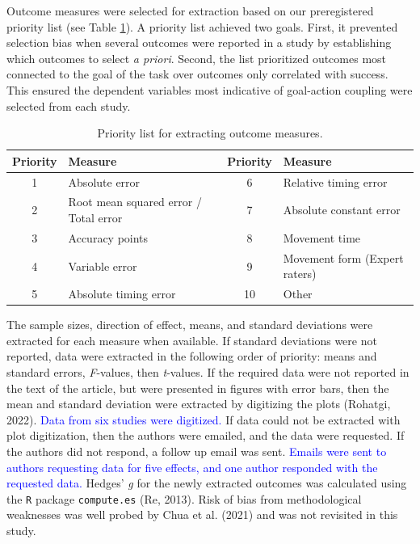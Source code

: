 \documentclass[
  man, donotrepeattitle,floatsintext]{apa7}
\begin{document}
Outcome measures were selected for extraction based on our preregistered priority list (see Table \ref{tab:table1}). A priority list achieved two goals. First, it prevented selection bias when several outcomes were reported in a study by establishing which outcomes to select \emph{a priori}. Second, the list prioritized outcomes most connected to the goal of the task over outcomes only correlated with success. This ensured the dependent variables most indicative of goal-action coupling were selected from each study.

\begin{table}

\caption{\label{tab:table1}Priority list for extracting outcome measures.}
\fontsize{10}{12}\selectfont
\begin{tabular}[t]{clcl}
\toprule
Priority & Measure & Priority & Measure\\
\midrule
1 & Absolute error & 6 & Relative timing error\\
2 & Root mean squared error / Total error & 7 & Absolute constant error\\
3 & Accuracy points & 8 & Movement time\\
4 & Variable error & 9 & Movement form (Expert raters)\\
5 & Absolute timing error & 10 & Other\\
\bottomrule
\end{tabular}
\end{table}

The sample sizes, direction of effect, means, and standard deviations were extracted for each measure when available. If standard deviations were not reported, data were extracted in the following order of priority: means and standard errors, \emph{F}-values, then \emph{t}-values. If the required data were not reported in the text of the article, but were presented in figures with error bars, then the mean and standard deviation were extracted by digitizing the plots (Rohatgi, 2022). \textcolor{blue}{Data from six studies were digitized.} If data could not be extracted with plot digitization, then the authors were emailed, and the data were requested. If the authors did not respond, a follow up email was sent. \textcolor{blue}{Emails were sent to authors requesting data for five effects, and one author responded with the requested data.} Hedges' \emph{g} for the newly extracted outcomes was calculated using the \texttt{R} package \texttt{compute.es} (Re, 2013). Risk of bias from methodological weaknesses was well probed by Chua et al. (2021) and was not revisited in this study.
\end{document}
